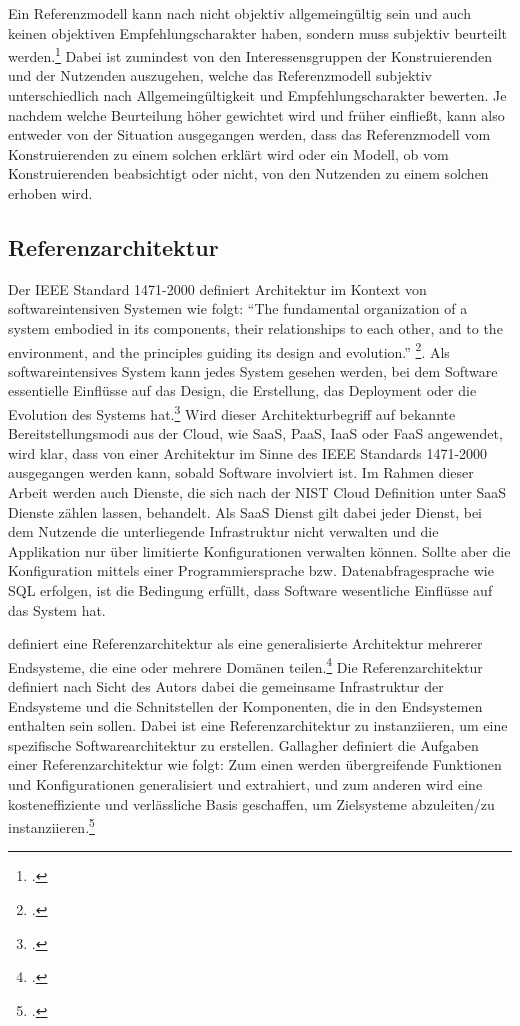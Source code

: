 Ein Referenzmodell kann nach \citeauthor{vomBrocke.2003} nicht objektiv allgemeingültig sein und auch keinen objektiven Empfehlungscharakter haben, sondern muss subjektiv beurteilt werden.\footcite[Vgl. auch im Folgenden][31~f.]{vomBrocke.2003}  Dabei ist zumindest von den Interessensgruppen der Konstruierenden und der Nutzenden auszugehen, welche das Referenzmodell subjektiv unterschiedlich nach Allgemeingültigkeit und Empfehlungscharakter bewerten. Je nachdem welche Beurteilung höher gewichtet wird und früher einfließt, kann also entweder von der Situation ausgegangen werden, dass das Referenzmodell vom Konstruierenden zu einem solchen erklärt wird oder ein Modell, ob vom Konstruierenden beabsichtigt oder nicht, von den Nutzenden zu einem solchen erhoben wird.


\subsection{Referenzarchitektur}
Der IEEE Standard 1471-2000 definiert Architektur im Kontext von softwareintensiven Systemen wie folgt:
\enquote{The fundamental organization of a system embodied in its components, their relationships
to each other, and to the environment, and the principles guiding its design and evolution.} \footcite[][3]{IEEEComputerSociety.2000}. Als softwareintensives System kann jedes System gesehen werden, bei dem Software essentielle Einflüsse auf das Design, die Erstellung, das Deployment oder die Evolution des Systems hat.\footcite[Vgl.][1]{IEEEComputerSociety.2000}
Wird dieser Architekturbegriff auf bekannte Bereitstellungsmodi aus der Cloud, wie \ac{SaaS}, \ac{PaaS}, \ac{IaaS} oder \ac{FaaS} angewendet, wird klar, dass von einer Architektur im Sinne des IEEE Standards 1471-2000 ausgegangen werden kann, sobald Software involviert ist. Im Rahmen dieser Arbeit werden auch Dienste, die sich nach der NIST Cloud Definition unter \ac{SaaS} Dienste zählen lassen, behandelt. Als \ac{SaaS} Dienst gilt dabei jeder Dienst, bei dem Nutzende die unterliegende Infrastruktur nicht verwalten und die Applikation nur über limitierte Konfigurationen verwalten können. Sollte aber die Konfiguration mittels einer Programmiersprache bzw. Datenabfragesprache wie \ac{SQL} erfolgen, ist die Bedingung erfüllt, dass Software wesentliche Einflüsse auf das System hat.

\citeauthor{Gallagher.2000} definiert eine Referenzarchitektur als eine generalisierte Architektur mehrerer Endsysteme, die eine oder mehrere Domänen teilen.\footcite[Vgl. auch im Folgenden][3]{Gallagher.2000} Die Referenzarchitektur definiert nach Sicht des Autors dabei die gemeinsame Infrastruktur der Endsysteme und die Schnitstellen der Komponenten, die in den Endsystemen enthalten sein sollen. Dabei ist eine Referenzarchitektur zu instanziieren, um eine spezifische Softwarearchitektur zu erstellen. Gallagher definiert die Aufgaben einer Referenzarchitektur wie folgt: Zum einen werden übergreifende Funktionen und Konfigurationen generalisiert und extrahiert, und zum anderen wird eine kosteneffiziente und verlässliche Basis geschaffen, um Zielsysteme abzuleiten/zu instanziieren.\footcite[Vgl.][3]{Gallagher.2000}

